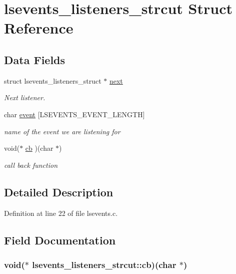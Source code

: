 \hypertarget{structlsevents__listeners__strcut}{
\section{lsevents\_\-listeners\_\-strcut Struct Reference}
\label{structlsevents__listeners__strcut}
}
\subsection*{Data Fields}
\begin{DoxyCompactItemize}
\item 
struct lsevents\_\-listeners\_\-struct $\ast$ \hyperlink{structlsevents__listeners__strcut_a4e76c0111d52fb0143460176874baa31}{next}
\begin{DoxyCompactList}\small\item\em Next listener. \item\end{DoxyCompactList}\item 
char \hyperlink{structlsevents__listeners__strcut_a117a2d78868c4f192604d7f522884602}{event} \mbox{[}LSEVENTS\_\-EVENT\_\-LENGTH\mbox{]}
\begin{DoxyCompactList}\small\item\em name of the event we are listening for \item\end{DoxyCompactList}\item 
void($\ast$ \hyperlink{structlsevents__listeners__strcut_a2a55edc04fa25053f06f6c4892ce18db}{cb} )(char $\ast$)
\begin{DoxyCompactList}\small\item\em call back function \item\end{DoxyCompactList}\end{DoxyCompactItemize}


\subsection{Detailed Description}


Definition at line 22 of file lsevents.c.

\subsection{Field Documentation}
\hypertarget{structlsevents__listeners__strcut_a2a55edc04fa25053f06f6c4892ce18db}{
\subsubsection[{cb}]{\setlength{\rightskip}{0pt plus 5cm}void($\ast$ {\bf lsevents\_\-listeners\_\-strcut::cb})(char $\ast$)}}
\label{structlsevents__listeners__strcut_a2a55edc04fa25053f06f6c4892ce18db}


